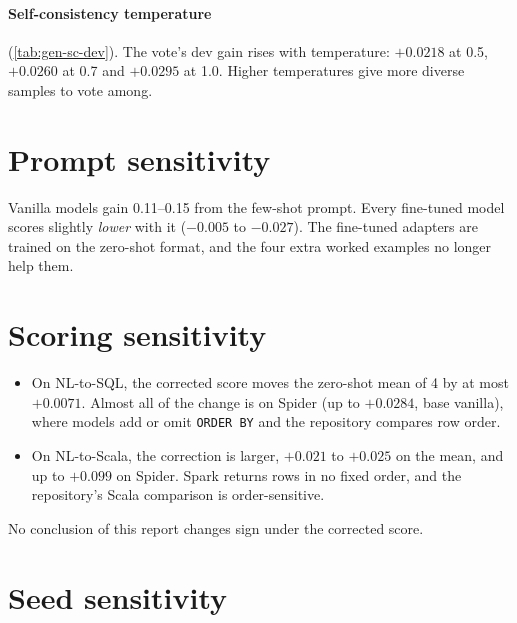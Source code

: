 \paragraph{Self-consistency temperature} (\cref{tab:gen-sc-dev}). The vote's dev gain rises with temperature: $+0.0218$
at 0.5, $+0.0260$ at 0.7 and $+0.0295$ at 1.0. Higher temperatures give more diverse samples to vote among.

\section{Prompt sensitivity}



\begin{observation}
Vanilla models gain 0.11--0.15 from the few-shot prompt. Every fine-tuned model scores slightly \emph{lower} with it
($-0.005$ to $-0.027$). The fine-tuned adapters are trained on the zero-shot format, and the four extra worked examples
no longer help them.
\end{observation}

\section{Scoring sensitivity}



\begin{observation}
\begin{itemize}
\item On NL-to-SQL, the corrected score moves the zero-shot mean of 4 by at most $+0.0071$. Almost all of the change
is on Spider (up to $+0.0284$, base vanilla), where models add or omit \texttt{ORDER BY} and the repository compares
row order.
\item On NL-to-Scala, the correction is larger, $+0.021$ to $+0.025$ on the mean, and up to $+0.099$ on Spider.
Spark returns rows in no fixed order, and the repository's Scala comparison is order-sensitive.
\end{itemize}
No conclusion of this report changes sign under the corrected score.
\end{observation}

\section{Seed sensitivity}

